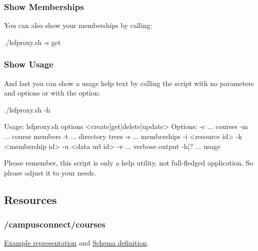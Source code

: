 \subsubsection{Show Memberships}
You can also show your memberships by calling:
\begin{code}
  ./lsfproxy.sh -s get
\end{code}

\subsubsection{Show Usage}
And last you can show a usage help text by calling the script with no
parameters and options or with the  option:
\begin{code}
  ./lsfproxy.sh -h

  Usage: lsfproxy.sh options <create|get|delete|update>
  Options:
    -c ... courses
    -m ... course members
    -t ... directory trees
    -s ... memberships
    -i <resource id>
    -k <membership id>
    -u <data url id>
    -v   ... verbose output
    -h|? ... usage
\end{code}
Please remember, this script is only a help utility, not full-fledged
application. So please adjust it to your needs. 

\hypertarget{campusconnect_resources}{}
\subsection{Resources}
\subsubsection{/campusconnect/courses}
\href{https://ecs.uni-stuttgart.de/ecsa-wiki/CampusConnect/Arbeitspakete/EcsREST/CmsCourses}{Example representation} and
\href{http://repo.or.cz/w/ecs.git/blob_plain/HEAD:/campusconnect/schemas/cc_courses.schema.json}{Schema definition}.



